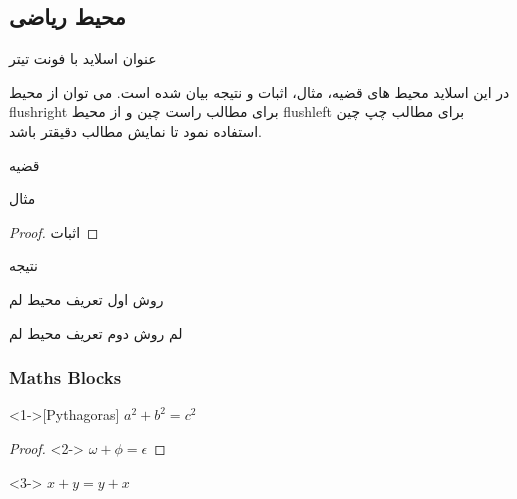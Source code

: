\documentclass[xcolor=svgnames,10pt]{beamer}
\begin{document}
\subsection{محیط ریاضی}
\begin{frame}[t]{{\titr عنوان اسلاید با فونت تیتر}}
    \begin{flushright}
        در این اسلاید محیط های قضیه، مثال، اثبات و نتیجه بیان شده است. می توان از محیط flushright برای مطالب راست چین و از محیط flushleft برای مطالب چپ چین استفاده نمود تا نمایش مطالب دقیقتر باشد.
    \end{flushright}
    \pause
    \begin{theorem}
        قضیه
    \end{theorem} 
    \pause
    \begin{example}
        مثال
    \end{example}
    \pause
    \begin{proof}
        اثبات
    \end{proof}
    \pause
    \begin{corollary}
        نتیجه
    \end{corollary}
\end{frame}
\begin{frame}[c]
\begin{lemma}
روش اول تعریف محیط لم
\end{lemma}
\end{frame}
\begin{frame}
\begin{block}{لم}
روش دوم تعریف محیط لم
\end{block}
\end{frame}
\begin{frame}
\frametitle{Maths Blocks}
\begin{theorem}<1->[Pythagoras] 
$ a^2 + b^2 = c^2$
\end{theorem}
\begin{proof}<2->
$\omega +\phi = \epsilon $
\end{proof}
\begin{corollary}<3->
$ x + y = y + x  $
\end{corollary}
\end{frame}
\end{document}
